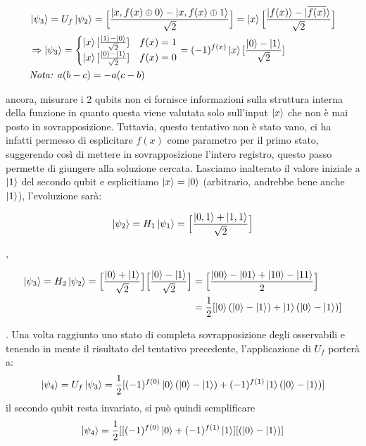 \documentclass[12pt,a4paper,openright]{report}
\newcommand*\xor{\mathbin{\oplus}}
\begin{document}
\begin{center}
    \begin{align*}
        &\ket{\psi_3} = U_f\ket{\psi_2} = \Big[  \frac{\ket{x,f(x) \xor 0} - \ket{x,f(x) \xor 1}}{\sqrt2} \Big] = \ket{x} \Big[\frac{\ket{f(x)} - \ket{\overline{f(x)}} } {\sqrt2} \Big]    \\
        & \Rightarrow   \ket{\psi_3} =  
        \begin{cases} 
              \ket{x}[\frac{\ket{1} - \ket{0}}{\sqrt{2}}] 
                      & f(x) = 1\\
              \ket{x}[\frac{\ket{0} - \ket{1}}{\sqrt{2}}] 
                         & f(x) = 0
          \end{cases} = 
          (-1)^{f(x)}\ket{x}[\frac{\ket{0} - \ket{1}}{\sqrt{2}}] \\
        & \textit{Nota: $a(b-c) = -a(c-b)$}  
    \end{align*}
\end{center}
ancora, misurare i 2 qubits non ci fornisce informazioni sulla struttura interna della funzione in quanto questa viene valutata solo sull'input $\ket{x}$ che non è mai posto in sovrapposizione.
Tuttavia, questo tentativo non è stato vano, ci ha infatti permesso di esplicitare $f(x)$ come parametro per il primo stato, suggerendo così di mettere in sovrapposizione l'intero registro, questo passo 
permette di giungere alla soluzione cercata. Lasciamo inalterato il valore iniziale a $\ket1$ del secondo qubit e esplicitiamo $\ket{x}=\ket{0}$ (arbitrario, andrebbe bene anche $\ket1$), l'evoluzione sarà:

\begin{center}
    \begin{align*}
        \ket{\psi_2} = H_1\ket{\psi_1} = \Big[  \frac{\ket{0,1} + \ket{1,1}}{\sqrt2} \Big]  
    \end{align*}
\end{center}
,

\begin{center}
    \begin{align*}
        \ket{\psi_3} = H_2\ket{\psi_2} = \Big[  \frac{\ket{0} + \ket{1}}{\sqrt2} \Big]\Big[  \frac{\ket{0} - \ket{1}}{\sqrt2} \Big] &= \Big[  \frac{\ket{00} - \ket{01} + \ket{10} - \ket{11}}{2} \Big] \\
                                                                                                                                    &= \frac{1}{2}[\ket{0} (\ket{0} - \ket{1}) + \ket{1}(\ket{0} - \ket{1})] 
    \end{align*}
\end{center}
. Una volta raggiunto uno stato di completa sovrapposizione degli osservabili e tenendo in mente il risultato del tentativo precedente, l'applicazione di $U_f$ porterà a:
\[
    \ket{\psi_4} = U_f\ket{\psi_3} = \frac{1}{2}[(-1)^{f(0)}\ket{0} (\ket{0} - \ket{1}) + (-1)^{f(1)}\ket{1}(\ket{0} - \ket{1})] 
\]
il secondo qubit resta invariato, si può quindi semplificare
\[
    \ket{\psi_4} = \frac{1}{2}[ [ (-1)^{f(0)}\ket{0} + (-1)^{f(1)}\ket{1} ] [ (\ket{0} - \ket{1}) ]
\]
\end{document}
